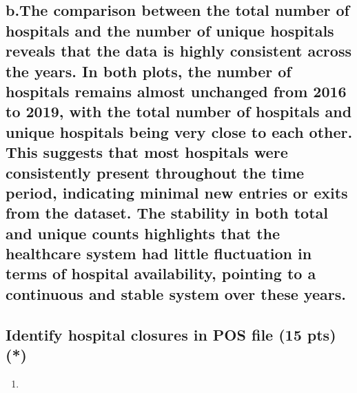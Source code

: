 \documentclass[
  letterpaper,
  DIV=11,
  numbers=noendperiod]{scrartcl}
\providecommand{\tightlist}{%
  \setlength{\itemsep}{0pt}\setlength{\parskip}{0pt}}\usepackage{longtable,booktabs,array}
\begin{document}
\subsection{b.The comparison between the total number of hospitals and
the number of unique hospitals reveals that the data is highly
consistent across the years. In both plots, the number of hospitals
remains almost unchanged from 2016 to 2019, with the total number of
hospitals and unique hospitals being very close to each other. This
suggests that most hospitals were consistently present throughout the
time period, indicating minimal new entries or exits from the dataset.
The stability in both total and unique counts highlights that the
healthcare system had little fluctuation in terms of hospital
availability, pointing to a continuous and stable system over these
years.}\label{b.the-comparison-between-the-total-number-of-hospitals-and-the-number-of-unique-hospitals-reveals-that-the-data-is-highly-consistent-across-the-years.-in-both-plots-the-number-of-hospitals-remains-almost-unchanged-from-2016-to-2019-with-the-total-number-of-hospitals-and-unique-hospitals-being-very-close-to-each-other.-this-suggests-that-most-hospitals-were-consistently-present-throughout-the-time-period-indicating-minimal-new-entries-or-exits-from-the-dataset.-the-stability-in-both-total-and-unique-counts-highlights-that-the-healthcare-system-had-little-fluctuation-in-terms-of-hospital-availability-pointing-to-a-continuous-and-stable-system-over-these-years.}

\subsection{Identify hospital closures in POS file (15 pts)
(*)}\label{identify-hospital-closures-in-pos-file-15-pts}

\begin{enumerate}
\def\labelenumi{\arabic{enumi}.}
\tightlist
\item
\end{enumerate}
\end{document}
